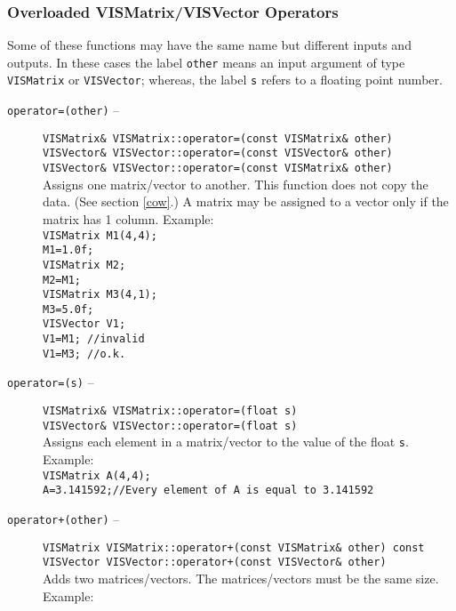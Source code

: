 \subsubsection{Overloaded VISMatrix/VISVector Operators}
\label{ml_omvo}
Some of these functions may have the same name but different
inputs and outputs.  In these cases the label {\tt other} means
an input argument of type {\tt VISMatrix} or {\tt VISVector}; whereas, the label
{\tt s} refers to a floating point number.
\begin{description}
\item[{\tt operator=(other)} --]
{\tt VISMatrix\& VISMatrix::operator=(const VISMatrix\& other)}\\
{\tt VISVector\& VISVector::operator=(const VISVector\& other)}\\
{\tt VISVector\& VISVector::operator=(const VISMatrix\& other)}\\
Assigns one matrix/vector to another.  This function does not copy
the data.  (See section \ref{cow}.)  A matrix may be assigned to a vector
only if the matrix has 1 column.  Example:\\
{\tt VISMatrix M1(4,4);\\
M1=1.0f;\\
VISMatrix M2;\\
M2=M1;\\
VISMatrix M3(4,1);\\
M3=5.0f;\\
VISVector V1;\\
V1=M1; //invalid\\
V1=M3; //o.k.}\\
\item[{\tt operator=(s)} --]
{\tt VISMatrix\& VISMatrix::operator=(float s)}\\
{\tt VISVector\& VISVector::operator=(float s)}\\
Assigns each element in a matrix/vector to the value of the float {\tt s}.  Example:\\
{\tt VISMatrix A(4,4);}\\
{\tt A=3.141592;//Every element of A is equal to 3.141592}\\
\item [{\tt operator+(other)} --]
{\tt VISMatrix VISMatrix::operator+(const VISMatrix\& other) const}\\
{\tt VISVector VISVector::operator+(const VISVector\& other)}\\
Adds two matrices/vectors.  The matrices/vectors must be the same size.  Example:\\

\end{description}
